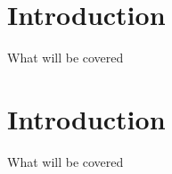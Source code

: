 
\section[Intro]{Introduction}
\begin{frame}{What will be covered}
\end{frame}

\section[Intro]{Introduction}
\begin{frame}{What will be covered}
\end{frame}

